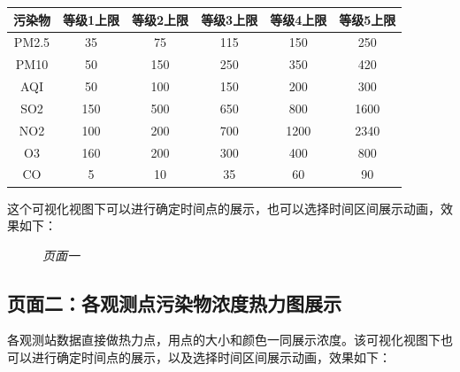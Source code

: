 ﻿\documentclass{article}
\begin{document}
\begin{CJK*}{GBK}{song}
\begin{center}
\begin{tabular}{|c|c|c|c|c|c|} \hline
污染物 & 等级1上限 & 等级2上限 & 等级3上限 & 等级4上限 & 等级5上限 \\ \hline
PM2.5 & 35 & 75 & 115 & 150 & 250 \\ \hline
PM10 & 50 & 150 & 250 & 350 & 420 \\ \hline
AQI & 50 & 100 & 150 & 200 & 300 \\ \hline
SO2 & 150 & 500 & 650 & 800 & 1600 \\ \hline
NO2 & 100 & 200 & 700 & 1200 & 2340 \\ \hline
O3 & 160 & 200 & 300 & 400 & 800 \\ \hline
CO & 5 & 10 & 35 & 60 & 90 \\ \hline
\end{tabular}
\end{center}

这个可视化视图下可以进行确定时间点的展示，也可以选择时间区间展示动画，效果如下：

\begin{figure}[ht]
\centering
{}
\caption{\textit{页面一}}
\end{figure}

\subsection{页面二：各观测点污染物浓度热力图展示}
\qquad 各观测站数据直接做热力点，用点的大小和颜色一同展示浓度。该可视化视图下也可以进行确定时间点的展示，以及选择时间区间展示动画，效果如下：


\end{CJK*}
\end{document}
